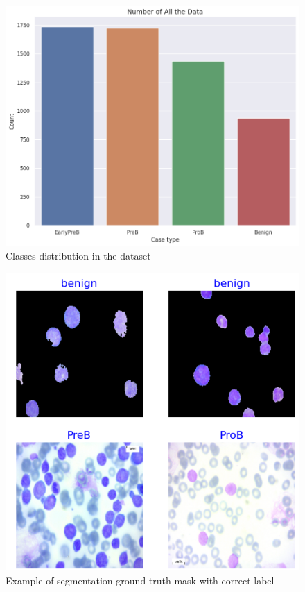 \documentclass[runningheads,a4paper,11pt]{report}
\begin{document}
\begin{figure}[h]
    \centering
    \includegraphics[scale=0.25]{images/classes_distribution.png} 
    \caption{Classes distribution in the dataset}
\end{figure}

\begin{figure}[h]
    \centering
    \includegraphics[scale=0.5]{images/samples.png} 
    \caption{Example of segmentation ground truth mask with correct label}
\end{figure}
\end{document}
